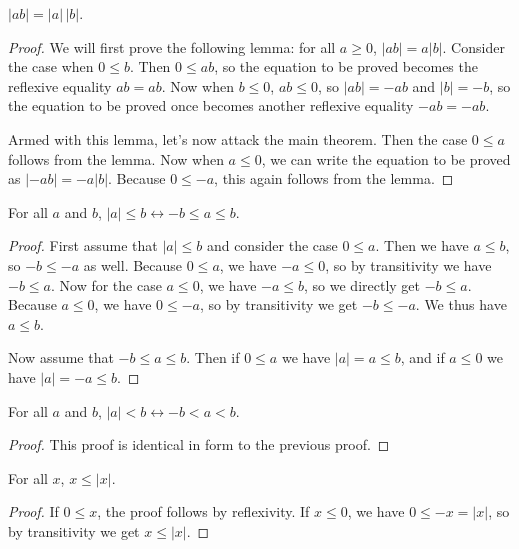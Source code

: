\documentclass[../../math.tex]{subfiles}
\begin{document}
\begin{theorem}
    $|ab| = |a|\,|b|$.
\end{theorem}
\begin{proof}
    We will first prove the following lemma: for all $a \geq 0$, $|ab| = a|b|$.
    Consider the case when $0 \leq b$.  Then $0 \leq ab$, so the equation to be
    proved becomes the reflexive equality $ab = ab$.  Now when $b \leq 0$, $ab
    \leq 0$, so $|ab| = -ab$ and $|b| = -b$, so the equation to be proved once
    becomes another reflexive equality $-ab = -ab$.

    Armed with this lemma, let's now attack the main theorem.  Then the case $0
    \leq a$ follows from the lemma.  Now when $a \leq 0$, we can write the
    equation to be proved as $|-ab| = -a|b|$.  Because $0 \leq -a$, this again
    follows from the lemma.
\end{proof}

\begin{theorem} \label{abs_le}
    For all $a$ and $b$, $|a| \leq b \leftrightarrow -b \leq a \leq b$.
\end{theorem}
\begin{proof}
    First assume that $|a| \leq b$ and consider the case $0 \leq a$.  Then we
    have $a \leq b$, so $-b \leq -a$ as well.  Because $0 \leq a$, we have $-a
    \leq 0$, so by transitivity we have $-b \leq a$.  Now for the case $a \leq
    0$, we have $-a \leq b$, so we directly get $-b \leq a$.  Because $a \leq
    0$, we have $0 \leq -a$, so by transitivity we get $-b \leq -a$.  We thus
    have $a \leq b$.

    Now assume that $-b \leq a \leq b$.  Then if $0 \leq a$ we have $|a| = a
    \leq b$, and if $a \leq 0$ we have $|a| = -a \leq b$.
\end{proof}

\begin{theorem} \label{abs_lt}
    For all $a$ and $b$, $|a| < b \leftrightarrow -b < a < b$.
\end{theorem}
\begin{proof}
    This proof is identical in form to the previous proof.
\end{proof}

\begin{theorem} \label{abs_le_pos}
    For all $x$, $x \leq |x|$.
\end{theorem}
\begin{proof}
    If $0 \leq x$, the proof follows by reflexivity.  If $x \leq 0$, we have $0
    \leq -x = |x|$, so by transitivity we get $x \leq |x|$.
\end{proof}
\end{document}
